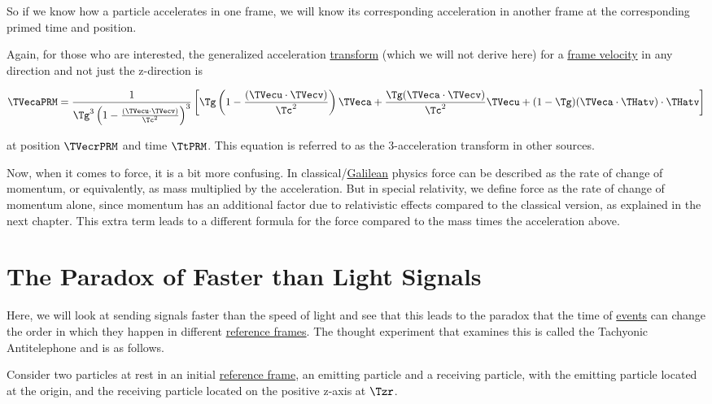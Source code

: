 So if we know how a particle accelerates in one frame, we will know its corresponding acceleration in another frame at the corresponding primed time and position.

\sidenote

Again, for those who are interested, the generalized acceleration \hyperlink{def-transform}{transform} (which we will not derive here) for a \hyperlink{def-frame-velocity}{frame velocity} in any direction and not just the z-direction is

\begin{equation}
	\TVecaPRM  = \frac{1}{ \Tg  ^3 \left(1-\frac{(\TVecu \cdot \TVecv )}{ \Tc ^2}\right)^3}\left[ \Tg  \left(1-\frac{(\TVecu \cdot\TVecv )}{ \Tc ^2}\right)\TVeca  + \frac{ \Tg  (\TVeca \cdot\TVecv )}{ \Tc ^2}\TVecu  + (1-{\Tg } ) (\TVeca \cdot\THatv ) \cdot\THatv \right]
\end{equation}

at position ${\TVecrPRM  }$ and time $\TtPRM $.
This equation is referred to as the 3-acceleration transform in other sources.

Now, when it comes to force, it is a bit more confusing.
In classical/\hyperlink{def-galilean-transform}{Galilean} physics force can be described as the rate of change of momentum, or equivalently, as mass multiplied by the acceleration.
But in special relativity, we define force as the rate of change of momentum alone, since momentum has an additional factor due to relativistic effects compared to the classical version, as explained in the next chapter.
This extra term leads to a different formula for the force compared to the mass times the acceleration above.

\section{The Paradox of Faster than Light Signals}\label{sect: The Paradox of Faster than Light Signals}

Here, we will look at sending signals faster than the speed of light and see that this leads to the paradox that the time of \hyperlink{def-event}{events} can change the order in which they happen in different \hyperlink{def-Reference-frame}{reference frames}.
The thought experiment that examines this is called the Tachyonic Antitelephone and is as follows.

Consider two particles at rest in an initial \hyperlink{def-Reference-frame}{reference frame}, an emitting particle and a receiving particle, with the emitting particle located at the origin, and the receiving particle located on the positive z-axis at $\Tzr$.

